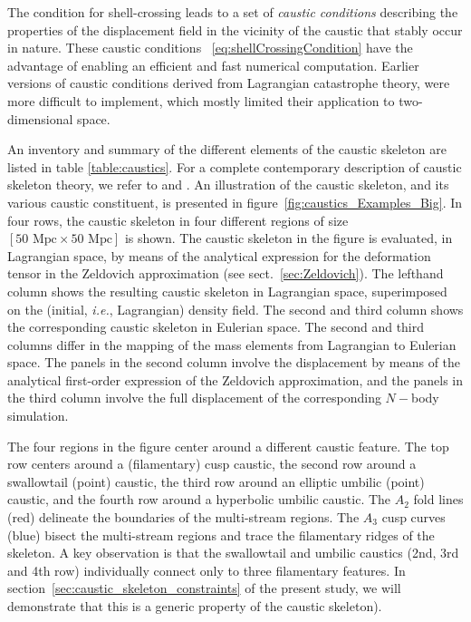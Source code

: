 \documentclass[a4paper, 11pt]{article}
\begin{document}
The condition for shell-crossing leads to a set of \textit{caustic conditions} describing the properties of the displacement field in the vicinity of the caustic that stably occur in nature. These caustic conditions ~\eqref{eq:shellCrossingCondition} have the advantage of enabling an efficient and fast numerical computation. Earlier versions of caustic conditions derived from Lagrangian catastrophe theory, \citep{Arnold:1972, Arnold:1976, Poston:1978, Gilmore:1981, Kravtsov:1983, Arnold:1984, Arnold:2012a, Arnold:2012b} were more difficult to implement, which mostly limited their application to two-dimensional space.

An inventory and summary of the different elements of the caustic skeleton are listed in table \ref{table:caustics}. For a complete contemporary description of caustic skeleton theory, we refer to \cite{Hidding:2014} and \cite{Feldbrugge:2018}. An illustration of the caustic skeleton, and its various caustic constituent, is presented in figure~\ref{fig:caustics_Examples_Big}. In four rows, the caustic skeleton in four different regions of size $[50\text{ Mpc}\times 50 \text{ Mpc}]$ is shown. The caustic skeleton in the figure is evaluated, in Lagrangian space, by means of the analytical expression for the deformation tensor in the Zeldovich approximation (see sect.~\ref{sec:Zeldovich}). The lefthand column shows the resulting caustic skeleton in Lagrangian space, superimposed on the (initial, \textit{i.e.}, Lagrangian) density field. The second and third column shows the corresponding caustic skeleton in Eulerian space. The second and third columns differ in the mapping of the mass elements from Lagrangian to Eulerian space. The panels in the second column involve the displacement by means of the analytical first-order expression of the Zeldovich approximation, and the panels in the third column involve the full displacement of the corresponding $N-$body simulation. 

The four regions in the figure center around a different caustic feature. The top row centers around a (filamentary) cusp caustic, the second row around a swallowtail (point) caustic, the third row around an elliptic umbilic (point) caustic, and the fourth row around a hyperbolic umbilic caustic. The $A_2$ fold lines (red) delineate the boundaries of the multi-stream regions. The $A_3$ cusp curves (blue) bisect the multi-stream regions and trace the filamentary ridges of the skeleton. A key observation is that the swallowtail and umbilic caustics (2nd, 3rd and 4th row) individually connect only to three filamentary features. In section~\ref{sec:caustic_skeleton_constraints} of the present study, we will demonstrate that this is a generic property of the caustic skeleton).
\end{document}
